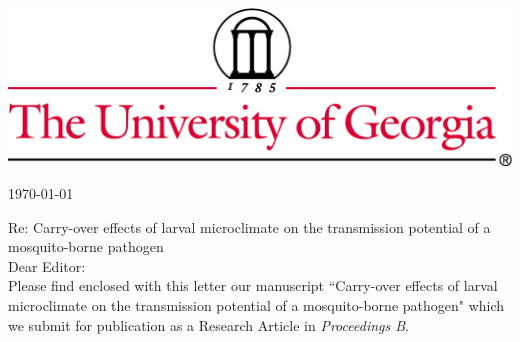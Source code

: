 \documentclass{letter}
\begin{document}

\begin{letter}


\vspace{-2in}
\includegraphics[width=\textwidth]{thin4c.png}

\begin{flushright}
\today
\end{flushright}


Re: Carry-over effects of larval microclimate on the transmission potential of a mosquito-borne pathogen\\

Dear Editor:\\

Please find enclosed with this letter our manuscript ``Carry-over effects of larval microclimate on the transmission potential of a mosquito-borne pathogen" which we submit for publication as a Research Article in \textit{{Proceedings B}}.\\


\end{letter}
\end{document}
